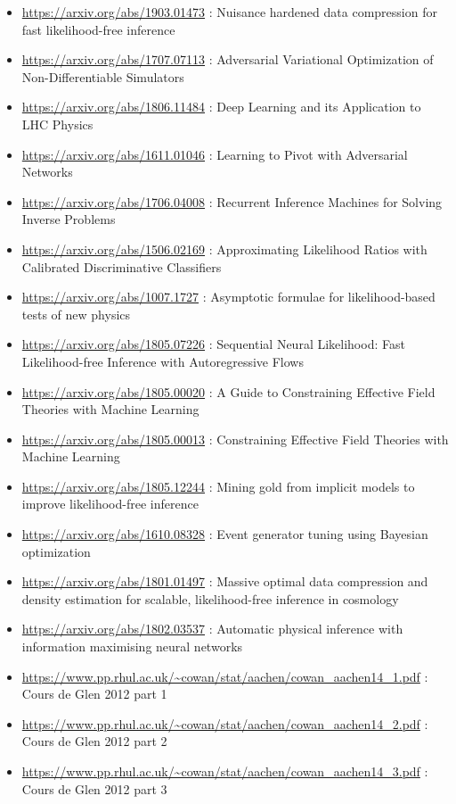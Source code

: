 \begin{itemize}
    \item \url{https://arxiv.org/abs/1903.01473} : Nuisance hardened data compression for fast likelihood-free inference
    \item \url{https://arxiv.org/abs/1707.07113} : Adversarial Variational Optimization of Non-Differentiable Simulators
    \item \url{https://arxiv.org/abs/1806.11484} : Deep Learning and its Application to LHC Physics
    \item \url{https://arxiv.org/abs/1611.01046} : Learning to Pivot with Adversarial Networks
    \item \url{https://arxiv.org/abs/1706.04008} : Recurrent Inference Machines for Solving Inverse Problems
    \item \url{https://arxiv.org/abs/1506.02169} : Approximating Likelihood Ratios with Calibrated Discriminative Classifiers
    \item \url{https://arxiv.org/abs/1007.1727} : Asymptotic formulae for likelihood-based tests of new physics
    \item \url{https://arxiv.org/abs/1805.07226} : Sequential Neural Likelihood: Fast Likelihood-free Inference with Autoregressive Flows
    \item \url{https://arxiv.org/abs/1805.00020} : A Guide to Constraining Effective Field Theories with Machine Learning
    \item \url{https://arxiv.org/abs/1805.00013} : Constraining Effective Field Theories with Machine Learning
    \item \url{https://arxiv.org/abs/1805.12244} : Mining gold from implicit models to improve likelihood-free inference
    \item \url{https://arxiv.org/abs/1610.08328} : Event generator tuning using Bayesian optimization
    \item \url{https://arxiv.org/abs/1801.01497} : Massive optimal data compression and density estimation for scalable, likelihood-free inference in cosmology
    \item \url{https://arxiv.org/abs/1802.03537} : Automatic physical inference with information maximising neural networks
    \item \url{https://www.pp.rhul.ac.uk/~cowan/stat/aachen/cowan_aachen14_1.pdf} : Cours de Glen 2012 part 1
    \item \url{https://www.pp.rhul.ac.uk/~cowan/stat/aachen/cowan_aachen14_2.pdf} : Cours de Glen 2012 part 2
    \item \url{https://www.pp.rhul.ac.uk/~cowan/stat/aachen/cowan_aachen14_3.pdf} : Cours de Glen 2012 part 3

\end{itemize}
